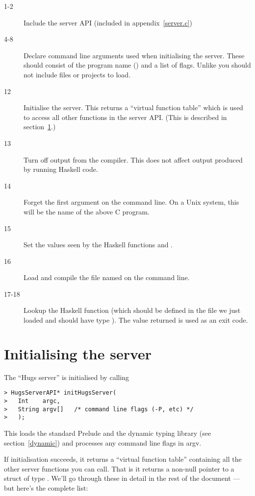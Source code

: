 \begin{description}
\item[1-2] 
  Include the server API (included in appendix~\ref{server.c})
\item[4-8]
  Declare command line arguments used when initialising the server.
  These should consist of the program name () and
  a list of flags.  Unlike \Hugs{} you should not include files or
  projects to load.
\item[12]
  Initialise the server.  This returns a ``virtual function table''
  which is used to access all other functions in the server API.
  (This is described in section~\ref{initHugs}.)
\item[13]
  Turn off output from the compiler. This does not affect output
  produced by running Haskell code.
\item[14]
  Forget the first argument on the command line.  On a Unix system,
  this will be the name of the above C program.
\item[15]
  Set the values seen by the Haskell functions 
  and .
\item[16]
  Load and compile the file named on the command line.
\item[17-18]
  Lookup the Haskell function  (which should be defined
  in the file we just loaded and should have type ).
  The value returned is used as an exit code.
\end{description}


\section{Initialising the server}\label{initHugs}

The ``Hugs server'' is initialised by calling 

\begin{verbatim}
> HugsServerAPI* initHugsServer(
>   Int    argc,
>   String argv[]   /* command line flags (-P, etc) */
>   );
\end{verbatim}

This loads the standard Prelude and the dynamic typing library (see
section~\ref{dynamic}) and processes any command line flags in argv.

If initialisation succeeds, it returns a ``virtual function table''
containing all the other server functions you can call.  That is it
returns a non-null pointer to a struct of type .
We'll go through these in detail in the rest of the document --- but
here's the complete list:

